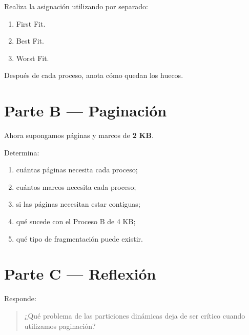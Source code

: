 \documentclass[
  spanish,
  letterpaper,
]{scrbook}
\providecommand{\tightlist}{%
  \setlength{\itemsep}{0pt}\setlength{\parskip}{0pt}}
\begin{document}
Realiza la asignación utilizando por separado:

\begin{enumerate}
\def\labelenumi{\arabic{enumi}.}
\tightlist
\item
  First Fit.
\item
  Best Fit.
\item
  Worst Fit.
\end{enumerate}

Después de cada proceso, anota cómo quedan los huecos.

\section{Parte B --- Paginación}\label{parte-b-paginaciuxf3n}

Ahora supongamos páginas y marcos de \textbf{2 KB}.

Determina:

\begin{enumerate}
\def\labelenumi{\arabic{enumi}.}
\tightlist
\item
  cuántas páginas necesita cada proceso;
\item
  cuántos marcos necesita cada proceso;
\item
  si las páginas necesitan estar contiguas;
\item
  qué sucede con el Proceso B de 4 KB;
\item
  qué tipo de fragmentación puede existir.
\end{enumerate}

\section{Parte C --- Reflexión}\label{parte-c-reflexiuxf3n}

Responde:

\begin{quote}
¿Qué problema de las particiones dinámicas deja de ser crítico cuando
utilizamos paginación?
\end{quote}
\end{document}
